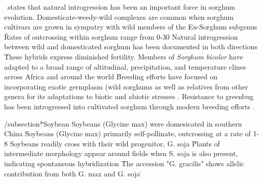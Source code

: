 \documentclass[11pt]{article}
\begin{document}
\cite{po1982sorghum}\ states that natural introgression has been an important force in sorghum evolution.
Domesticate-weedy-wild complexes are common when sorghum cultivars are grown in sympatry with wild members of the Eu-Sorghum subgenus \cite{de1978systematics, doggett1968disruptive, baker1972human}\.
Rates of outcrossing within sorghum range from 0-30%
Natural introgression between wild and domesticated sorghum has been documented in both directions \cite{kuhlman2006interspecific, aldrich1992restriction, aldrich1992patterns, doggett1988sorghum, baker1972migrations}\.
These hybrids express diminished fertility.
Members of \emph{Sorghum bicolor} have adapted to a broad range of altitudinal, precipitation, and temperature clines across Africa and around the world \cite{po1982sorghum, CWR}\.
Breeding efforts have focused on incorporating exotic germplasm (wild sorghums as well as relatives from other genera \cite{de1976cytogenetics} for its adaptations to biotic and abiotic stresses \cite{reddy2006current, po1982sorghum, johnson1979breeding}.
Resistance to greenbug has been introgressed into cultivated sorghum through modern breeding efforts \cite{johnson1979breeding}.















/subsection*{Soybean}
Soybeans (Glycine max) were domesicated in southern China \cite{guo2010single}\.
Soybeans (Glycine max) primarily self-pollinate, outcrossing at a rate of 1-8%
Soybeans readily cross with their wild progenitor, G. soja \cite{singh1988genomic}\.
Plants of intermediate morphology appear around fields when S. soja is also present, indicating spontaneous hybridization \cite{kwon1972studies}\.
The accession "G. gracilis" shows allelic contribution from both G. max and G. soja \cite{keim1989restriction}\.


\end{document}
